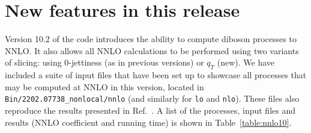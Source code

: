 \section{New features in this release}
\label{sec:latest}

Version 10.2 of the code introduces the ability to compute diboson processes
to NNLO.  It also allows all NNLO calculations to be performed using two
variants of slicing: using 0-jettiness (as in previous versions) or $q_T$ (new).
We have included a suite of input files that have been set up
to showcase all processes that may be computed at NNLO in this version, located
in {\tt Bin/2202.07738\_nonlocal/nnlo} (and similarly for {\tt lo} and {\tt nlo}).
These files also reproduce the results presented in Ref.~\cite{Campbell:2022gdq}.
A list of the processes, input files and results (NNLO coefficient and running time)
is shown in Table~\ref{table:nnlo10}.

